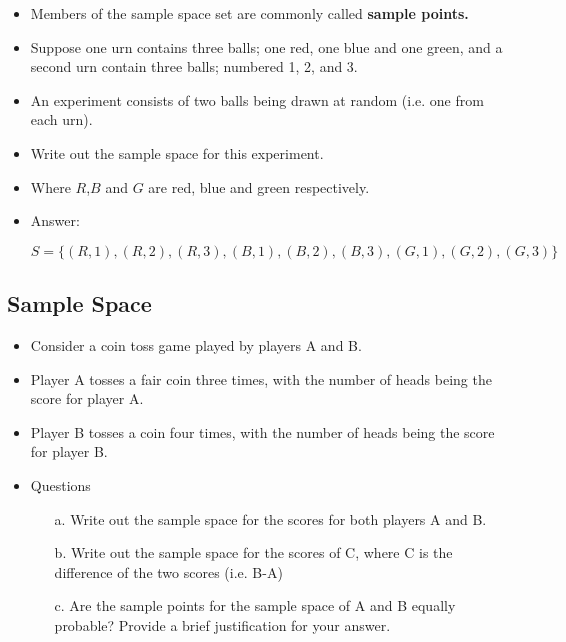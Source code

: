 \documentclass[]{report}
\begin{document}
{{{{\begin{itemize}
\item Members of the sample space set are commonly called \textbf{sample points.}


\item Suppose one urn contains three balls; one red, one blue and one green, and a second urn contain three balls; numbered 1, 2, and 3. \item An experiment consists of two balls being drawn at random (i.e. one from each urn).

\item Write out the sample space for this experiment.

\end{itemize}


\begin{itemize}

\item Where $R$,$B$ and $G$ are red, blue and green respectively.

\item Answer: 

\[S = \{(R,1),(R,2),(R,3),(B,1),(B,2),(B,3),(G,1),(G,2),(G,3) \}\]

\end{itemize}


\newpage 

\subsection{Sample Space}

\begin{itemize}
\item Consider a coin toss game played by players A and B. \item Player A tosses a fair coin three times, with the number of heads being the score for player A. \item Player B tosses a coin four times, with the number of heads being the score for player B.
\item Questions
\begin{itemize}
\item[a.] Write out the sample space for the scores for both players A and B.
\item[b.] Write out the sample space for the scores of C, where C is the difference of the two scores (i.e. B-A)
\item[c.] Are the sample points for the sample space of A and B equally probable? Provide a brief justification for your answer.
\end{itemize}



\end{itemize}}}}}
\end{document}
